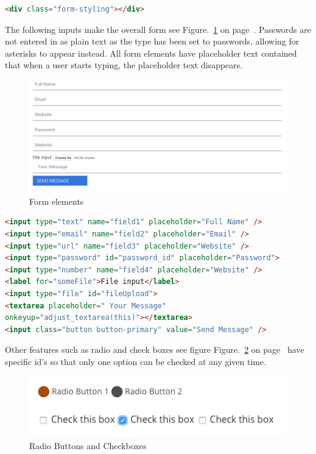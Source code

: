 \begin{lstlisting}[language=HTML]
<div class="form-styling"></div>
\end{lstlisting}

The following inputs make the overall form see Figure.~\ref{fig:form} on  page~\pageref{fig:form}. Passwords are not entered in as plain text as the type has been set to passwords, allowing for asterisks to appear instead. All form elements have placeholder text contained that when a user starts typing, the placeholder text disappears.

\begin{figure}[h]
\centering
\includegraphics[scale=0.3]{images/form}
\caption{Form elements}
  \label{fig:form}
\end{figure}


\begin{lstlisting}[language=HTML]
<input type="text" name="field1" placeholder="Full Name" />
<input type="email" name="field2" placeholder="Email" />
<input type="url" name="field3" placeholder="Website" />
<input type="password" id="password_id" placeholder="Password">
<input type="number" name="field4" placeholder="Website" />
<label for="someFile">File input</label>
<input type="file" id="fileUpload">
<textarea placeholder=" Your Message" 
onkeyup="adjust_textarea(this)"></textarea>
<input class="button button-primary" value="Send Message" />
\end{lstlisting}

Other features such as radio and check boxes see figure Figure.~\ref{fig:radio} on  page~\pageref{fig:radio} have specific id's so that only one option can be checked at any given time. 

\begin{figure}[h]
\centering
\includegraphics[scale=0.4]{images/radio}
\caption{Radio Buttons and Checkboxes}
  \label{fig:radio}
\end{figure}

